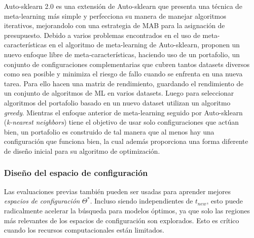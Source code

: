 Auto-sklearn 2.0 \cite{Feurer2020AutoSklearn2T} es una extensión de Auto-sklearn que presenta una técnica de meta-learning más simple y perfecciona su manera de manejar algoritmos iterativos, mejorandolo con una estrategia de MAB para la asignación de presupuesto. Debido a varios problemas encontrados en el uso de meta-características en el algoritmo de meta-learning de Auto-sklearn, proponen un nuevo enfoque libre de meta-características, haciendo uso de un portafolio, un conjunto de configuraciones complementarias que cubren tantos datasets diversos como sea posible y minimiza el riesgo de fallo cuando se enfrenta en una nueva tarea. Para ello hacen una matriz de rendimiento, guardando el rendimiento de un conjunto de algoritmos de ML en varios datasets. Luego para seleccionar algoritmos del portafolio basado en un nuevo dataset utilizan un algoritmo \textit{greedy}. Mientras el enfoque anterior de meta-learning seguido por Auto-sklearn (\textit{k-nearest neighbors}) tiene el objetivo de usar solo configuraciones que actúan bien, un portafolio es construido de tal manera que al menos hay una configuración que funciona bien, la cual además proporciona una forma diferente de diseño inicial para su algoritmo de optimización.

\subsubsection{Diseño del espacio de configuración}



Las evaluaciones previas también pueden ser usadas para aprender mejores \textit{espacios de configuración} $\Theta^*$. Incluso siendo independientes de $t_{new}$, esto puede radicalmente acelerar la búsqueda para modelos óptimos, ya que solo las regiones más relevantes de los espacios de configuración son explorados. Esto es crítico cuando los recursos computacionales están limitados. 

